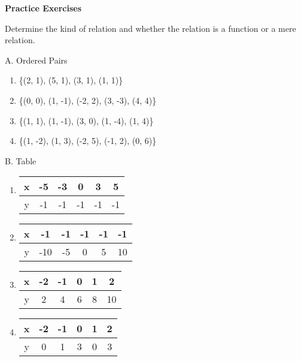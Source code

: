 \textbf{Practice Exercises}

\vspce

Determine the kind of relation and whether the relation is a function or a mere relation. 

A. Ordered Pairs 
 
\begin{enumerate}[label = \arabic*. ]
\item \hspce  \{(2, 1), (5, 1), (3, 1), (1, 1)\}
\item \hspce  \{(0, 0), (1, -1), (-2, 2), (3, -3), (4, 4)\}

\item \hspce  \{(1, 1), (1, -1), (3, 0), (1, -4), (1, 4)\}

\item \hspce  \{(1, -2), (1, 3), (-2, 5), (-1, 2), (0, 6)\}

\end{enumerate}
 
B. Table

\begin{enumerate}[label = \arabic*. ]
\item \hspce  
\begin{tabular}{|c|c|c|c|c|c|}
\hline 
x & -5 & -3 & 0 & 3 & 5 \\
\hline 
y & -1 & -1 & -1 & -1 & -1 \\
\hline 
\end{tabular}

\item \hspce  
\begin{tabular}{|c|c|c|c|c|c|}
\hline 
x & -1 & -1 & -1 & -1 & -1 \\
\hline 
y & -10 & -5 & 0 & 5 & 10 \\
\hline 
\end{tabular}

\item \hspce  
\begin{tabular}{|c|c|c|c|c|c|}
\hline 
x & -2 & -1 & 0 & 1 & 2 \\
\hline 
y & 2 & 4 & 6 & 8 & 10 \\
\hline 
\end{tabular}

\item \hspce  
\begin{tabular}{|c|c|c|c|c|c|}
\hline 
x & -2 & -1 & 0 & 1 & 2 \\
\hline 
y & 0 & 1 & 3 & 0 & 3 \\
\hline 
\end{tabular}
 
\end{enumerate} 



